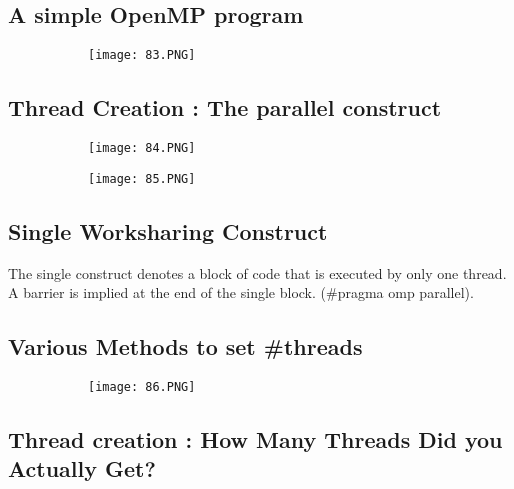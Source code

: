 \documentclass{article}
\begin{document}
\subsection{A simple OpenMP program}

\begin{figure}[ht!]
  \centering
  \begin{subfigure}[b]{0.7\linewidth}
    \texttt{[image: 83.PNG]}
  \end{subfigure}
\end{figure}

\subsection{Thread Creation : The parallel construct}

\begin{figure}[ht!]
  \centering
  \begin{subfigure}[b]{0.5\linewidth}
    \texttt{[image: 84.PNG]}
  \end{subfigure}
     \begin{subfigure}[b]{0.49\textwidth}
         \centering
         \texttt{[image: 85.PNG]}
     \end{subfigure}
\end{figure}

\subsection{Single Worksharing Construct}

The single construct denotes a block of code that is executed by only one thread. A barrier is implied at the end of the single block. (\#pragma omp parallel).

\subsection{Various Methods to set \#threads}

\begin{figure}[ht!]
  \centering
  \begin{subfigure}[b]{0.7\linewidth}
    \texttt{[image: 86.PNG]}
  \end{subfigure}
\end{figure}

\subsection{Thread creation : How Many Threads Did you Actually Get?}
\end{document}
